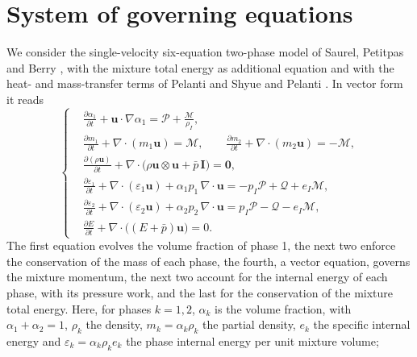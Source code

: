\section{System of governing equations}
\label{sec:governing}
We consider the single-velocity six-equation two-phase model of Saurel, Petitpas and Berry \cite{SPB2009}, with the
mixture total energy as additional equation and with the heat- and mass-transfer terms of Pelanti and Shyue
\cite{PelantiShyue2014} and Pelanti \cite{Pelanti2022}. In vector form it reads
\begin{equation}
\left\{
\begin{aligned}
&\frac{\partial\alpha_1}{\partial t}+\mathbf u\cdot\nabla\alpha_1=\mathcal P+\frac{\mathcal M}{\rho_I},\\
&\frac{\partial m_1}{\partial t}+\nabla\cdot(m_1\mathbf u)=\mathcal M,\qquad \frac{\partial m_2}{\partial t}+\nabla\cdot(m_2\mathbf u)=-\mathcal M,\\
&\frac{\partial(\rho\mathbf u)}{\partial t}+\nabla\cdot\big(\rho\mathbf u\otimes\mathbf u+\bar p\,\mathbf I\big)=\mathbf 0,\\
&\frac{\partial\varepsilon_1}{\partial t}+\nabla\cdot(\varepsilon_1\mathbf u)+\alpha_1p_1\,\nabla\cdot\mathbf u=-p_I\mathcal P+\mathcal Q+e_I\mathcal M,\\
&\frac{\partial\varepsilon_2}{\partial t}+\nabla\cdot(\varepsilon_2\mathbf u)+\alpha_2p_2\,\nabla\cdot\mathbf u=p_I\mathcal P-\mathcal Q-e_I\mathcal M,\\
&\frac{\partial E}{\partial t}+\nabla\cdot\big((E+\bar p)\mathbf u\big)=0 .
\end{aligned}\right.
\label{eq:model}
\end{equation}
The first equation evolves the volume fraction of phase 1, the next two enforce the conservation of the mass of each
phase, the fourth, a vector equation, governs the mixture momentum, the next two account for the
internal energy of each phase, with its pressure work, and the last for the conservation of the mixture total energy.
Here, for phases $k=1,2$, $\alpha_k$ is the volume fraction, with $\alpha_1+\alpha_2=1$, $\rho_k$ the density, $m_k=\alpha_k\rho_k$ the partial
density, $e_k$ the specific internal energy and $\varepsilon_k=\alpha_k\rho_ke_k$ the phase internal energy per unit mixture volume;
